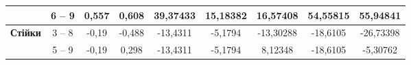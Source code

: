 \documentclass[a4paper,14pt]{article}
\begin{document}
\begin{landscape}
\begin{center}
\begin{table}[]
\begin{tabular}{|c|c|c|c|c|c|c|c|c|}
                                             & 6 – 9                                & 0,557                                                                             & 0,608                                                                            & 39,37433                                                                                                         & 15,18382                                                                           & 16,57408                                                                           & 54,55815                      & 55,94841                      \\ \hline
    \multirow{2}{*}{\textbf{Стійки}}         & 3 – 8                                & -0,19                                                                             & -0,488                                                                           & -13,4311                                                                                                         & -5,1794                                                                            & -13,30288                                                                          & -18,6105                      & -26,73398                     \\ \cline{2-9} 
                                             & 5 – 9                                & -0,19                                                                             & 0,298                                                                            & -13,4311                                                                                                         & -5,1794                                                                            & 8,12348                                                                            & -18,6105                      & -5,30762                      \\ \hline
    \end{tabular}
    \end{table}
\end{center}
\end{landscape}
\end{document}
